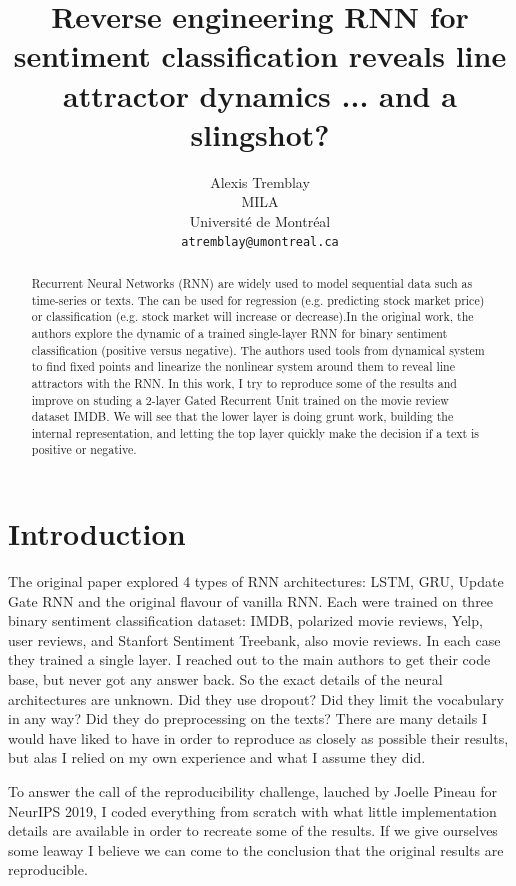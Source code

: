 \documentclass{article}
\title{Reverse engineering RNN for sentiment classification reveals line attractor dynamics ... and a slingshot?}
\author{%
  Alexis Tremblay \\
  MILA\\
  Université de Montréal\\
  \texttt{atremblay@umontreal.ca} \\
}
\begin{document}
\maketitle

\begin{abstract} 
  Recurrent Neural Networks (RNN) are widely used to model sequential data such as
  time-series or texts. The can be used for regression (e.g. predicting stock market
  price) or classification (e.g. stock market will increase or decrease).In the 
  original work, the authors explore the dynamic of a trained single-layer RNN 
  for binary sentiment classification (positive versus negative). The authors used tools
  from dynamical system to find fixed points and linearize the nonlinear system around them
  to reveal line attractors with the RNN. In this work, I try to reproduce some of the results
  and improve on studing a 2-layer Gated Recurrent Unit trained on the movie review dataset
  IMDB. We will see that the lower layer is doing grunt work, building the internal 
  representation, and letting the top layer quickly make the decision if a text is 
  positive or negative.
\end{abstract}

\section{Introduction}
The original paper explored 4 types of RNN architectures: LSTM, GRU, Update Gate RNN and the original flavour of vanilla RNN. Each were trained on three binary sentiment classification dataset: IMDB, polarized movie reviews, Yelp, user reviews, and Stanfort Sentiment Treebank, also movie reviews. In each case they trained a single layer. I reached out to the main authors to get their code base, but never got any answer back. So the exact details of the neural architectures are unknown. Did they use dropout? Did they limit the vocabulary in any way? Did they do preprocessing on the texts? There are many details I would have liked to have in order to reproduce as closely as possible their results, but alas I relied on my own experience and what I assume they did. 

To answer the call of the reproducibility challenge, lauched by Joelle Pineau for NeurIPS 2019, I coded everything from scratch with what little implementation details are available in order to recreate some of the results. If we give ourselves some leaway I believe we can come to the conclusion that the original results are reproducible. 
\end{document}
